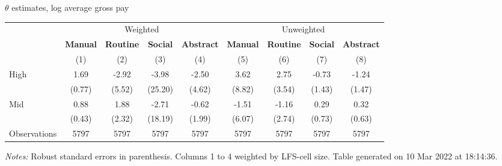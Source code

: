 \begin{center}
\begin{threeparttable}[!h]
\caption{$ \theta $ estimates, log average gross pay}
\begin{tabular}{lcccccccc}
\toprule
\toprule
& \multicolumn{4}{c}{Weighted} & \multicolumn{4}{c}{Unweighted} \\
&\multicolumn{1}{c}{\textbf{Manual}}&\multicolumn{1}{c}{\textbf{Routine}}&\multicolumn{1}{c}{\textbf{Social}}&\multicolumn{1}{c}{\textbf{Abstract}}&\multicolumn{1}{c}{\textbf{Manual}}&\multicolumn{1}{c}{\textbf{Routine}}&\multicolumn{1}{c}{\textbf{Social}}&\multicolumn{1}{c}{\textbf{Abstract}} \\
\textbf{}&\multicolumn{1}{c}{(1)}&\multicolumn{1}{c}{(2)}&\multicolumn{1}{c}{(3)}&\multicolumn{1}{c}{(4)}&\multicolumn{1}{c}{(5)}&\multicolumn{1}{c}{(6)}&\multicolumn{1}{c}{(7)}&\multicolumn{1}{c}{(8)} \\
\midrule
High                &        1.69&       -2.92&       -3.98&       -2.50&        3.62&        2.75&       -0.73&       -1.24\\
                    &      (0.77)&      (5.52)&     (25.20)&      (4.62)&      (8.82)&      (3.54)&      (1.43)&      (1.47)\\
Mid                 &        0.88&        1.88&       -2.71&       -0.62&       -1.51&       -1.16&        0.29&        0.32\\
                    &      (0.43)&      (2.32)&     (18.19)&      (1.99)&      (6.07)&      (2.74)&      (0.73)&      (0.63)\\
Observations        &        5797&        5797&        5797&        5797&        5797&        5797&        5797&        5797\\
\bottomrule
\bottomrule
\end{tabular}
\begin{tablenotes}
\item \footnotesize \textit{Notes:} Robust standard errors in parenthesis. Columns 1 to 4 weighted by LFS-cell size. Table generated on 10 Mar 2022 at 18:14:36.
\end{tablenotes}
\end{threeparttable}
\end{center}
